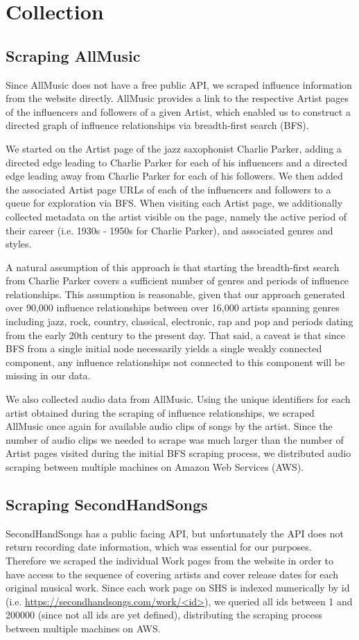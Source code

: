 \section{Collection}
\subsection*{Scraping AllMusic}
Since AllMusic does not have a free public API, we scraped influence information from the website directly. AllMusic provides a link to the respective Artist pages of the influencers and followers of a given Artist, which enabled us to construct a directed graph of influence relationships via breadth-first search (BFS). 

We started on the Artist page of the jazz saxophonist Charlie Parker, adding a directed edge leading to Charlie Parker for each of his influencers and a directed edge leading away from Charlie Parker for each of his followers. We then added the associated Artist page URLs of each of the influencers and followers to a queue for exploration via BFS. When visiting each Artist page, we additionally collected metadata on the artist visible on the page, namely the active period of their career (i.e. 1930s - 1950s for Charlie Parker), and associated genres and styles.

A natural assumption of this approach is that starting the breadth-first search from Charlie Parker covers a sufficient number of genres and periods of influence relationships. This assumption is reasonable, given that our approach generated over 90,000 influence relationships between over 16,000 artists spanning genres including jazz, rock, country, classical, electronic, rap and pop and periods dating from the early 20th century to the present day. That said, a caveat is that since BFS from a single initial node necessarily yields a single weakly connected component, any influence relationships not connected to this component will be missing in our data.

We also collected audio data from AllMusic. Using the unique identifiers for each artist obtained during the scraping of influence relationships, we scraped AllMusic once again for available audio clips of songs by the artist. Since the number of audio clips we needed to scrape was much larger than the number of Artist pages visited during the initial BFS scraping process, we distributed audio scraping between multiple machines on Amazon Web Services (AWS).

\subsection*{Scraping SecondHandSongs}
SecondHandSongs has a public facing API, but unfortunately the API does not return recording date information, which was essential for our purposes. Therefore we scraped the individual Work pages from the website in order to have access to the sequence of covering artists and cover release dates for each original musical work. Since each work page on SHS is indexed numerically by id (i.e. \url{https://secondhandsongs.com/work/<id>}), we queried all ids between 1 and 200000 (since not all ids are yet defined), distributing the scraping process between multiple machines on AWS.


